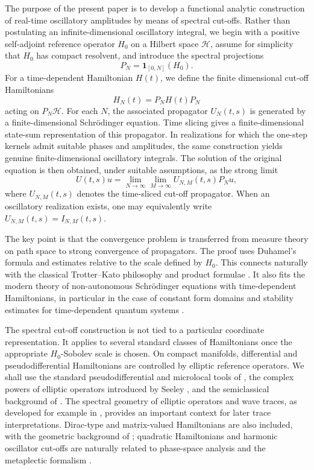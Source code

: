 \documentclass[11pt]{amsart}
\theoremstyle{plain}
\theoremstyle{definition}
\theoremstyle{remark}
\newcommand{\Hilb}{\mathcal H}
\begin{document}
The purpose of the present paper is to develop a functional analytic
construction of real-time oscillatory amplitudes by means of spectral
cut-offs.  Rather than postulating an infinite-dimensional oscillatory
integral, we begin with a positive self-adjoint reference operator
\(H_0\) on a Hilbert space \(\Hilb\), assume for simplicity that
\(H_0\) has compact resolvent, and introduce the spectral projections
\[
        P_N=\mathbf 1_{[0,N]}(H_0).
\]
For a time-dependent Hamiltonian \(H(t)\), we define the finite
dimensional cut-off Hamiltonians
\[
        H_N(t)=P_NH(t)P_N
\]
acting on \(P_N\Hilb\).  For each \(N\), the associated propagator
\(U_N(t,s)\) is generated by a finite-dimensional Schr\"odinger
equation.  Time slicing gives a finite-dimensional state-sum
representation of this propagator.  In realizations for which the
one-step kernels admit suitable phases and amplitudes, the same
construction yields genuine finite-dimensional oscillatory integrals.
The solution of the original equation is then obtained, under suitable
assumptions, as the strong limit
\[
        U(t,s)u
        =
        \lim_{N\to\infty}\lim_{M\to\infty}
        U_{N,M}(t,s)P_Nu,
\]
where \(U_{N,M}(t,s)\) denotes the time-sliced cut-off propagator.  When
an oscillatory realization exists, one may equivalently write
\(U_{N,M}(t,s)=I_{N,M}(t,s)\).

The key point is that the convergence problem is transferred from
measure theory on path space to strong convergence of propagators.  The
proof uses Duhamel's formula and estimates relative to the scale
defined by \(H_0\).  This connects naturally with the classical
Trotter--Kato philosophy and product formulae
\cite{Trotter1959,Chernoff1968,Kurtz1969,IchinoseTamura1997}.  It also
fits the modern theory of non-autonomous Schr\"odinger equations with
time-dependent Hamiltonians, in particular in the case of constant form
domains and stability estimates for time-dependent quantum systems
\cite{Balmaseda2022,Balmaseda2024}.

The spectral cut-off construction is not tied to a particular
coordinate representation.  It applies to several standard classes of
Hamiltonians once the appropriate \(H_0\)-Sobolev scale is chosen.  On
compact manifolds, differential and pseudodifferential Hamiltonians are
controlled by elliptic reference operators.  We shall use the standard
pseudodifferential and microlocal tools of
\cite{HormanderI,HormanderIII,Shubin1987,Taylor1981,Taylor1991}, the
complex powers of elliptic operators introduced by Seeley
\cite{Seeley1967}, and the semiclassical background of
\cite{Robert1987,DimassiSjostrand1999}.  The spectral geometry of
elliptic operators and wave traces, as developed for example in
\cite{DuistermaatGuillemin1975,GuilleminSternberg1977,
Melrose1982,Melrose1995}, provides an important context for later trace
interpretations.  Dirac-type and matrix-valued Hamiltonians are also
included, with the geometric background of
\cite{LawsonMichelsohn1989,BaerBallmann2016}; quadratic Hamiltonians and
harmonic oscillator cut-offs are naturally related to phase-space
analysis and the metaplectic formalism \cite{Folland1989}.
\end{document}
